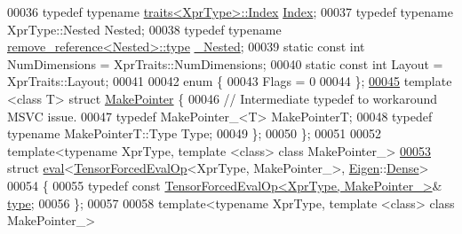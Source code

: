 \begin{DoxyCode}
00036   \textcolor{keyword}{typedef} \textcolor{keyword}{typename} \hyperlink{struct_eigen_1_1internal_1_1traits}{traits<XprType>::Index} \hyperlink{namespace_eigen_a62e77e0933482dafde8fe197d9a2cfde}{Index};
00037   \textcolor{keyword}{typedef} \textcolor{keyword}{typename} XprType::Nested Nested;
00038   \textcolor{keyword}{typedef} \textcolor{keyword}{typename} \hyperlink{group___sparse_core___module}{remove\_reference<Nested>::type} 
      \hyperlink{group___sparse_core___module}{\_Nested};
00039   \textcolor{keyword}{static} \textcolor{keyword}{const} \textcolor{keywordtype}{int} NumDimensions = XprTraits::NumDimensions;
00040   \textcolor{keyword}{static} \textcolor{keyword}{const} \textcolor{keywordtype}{int} Layout = XprTraits::Layout;
00041 
00042   \textcolor{keyword}{enum} \{
00043     Flags = 0
00044   \};
\hyperlink{struct_eigen_1_1internal_1_1traits_3_01_tensor_forced_eval_op_3_01_xpr_type_00_01_make_pointer___01_4_01_4_1_1_make_pointer}{00045}   \textcolor{keyword}{template} <\textcolor{keyword}{class} T> \textcolor{keyword}{struct }\hyperlink{struct_eigen_1_1_make_pointer}{MakePointer} \{
00046     \textcolor{comment}{// Intermediate typedef to workaround MSVC issue.}
00047     \textcolor{keyword}{typedef} MakePointer\_<T> MakePointerT;
00048     \textcolor{keyword}{typedef} \textcolor{keyword}{typename} MakePointerT::Type Type;
00049   \};
00050 \};
00051 
00052 \textcolor{keyword}{template}<\textcolor{keyword}{typename} XprType, \textcolor{keyword}{template} <\textcolor{keyword}{class}> \textcolor{keyword}{class }MakePointer\_>
\hyperlink{struct_eigen_1_1internal_1_1eval_3_01_tensor_forced_eval_op_3_01_xpr_type_00_01_make_pointer___01_4_00_01_eigen_1_1_dense_01_4}{00053} \textcolor{keyword}{struct }\hyperlink{struct_eigen_1_1internal_1_1eval}{eval}<\hyperlink{class_eigen_1_1_tensor_forced_eval_op}{TensorForcedEvalOp}<XprType, MakePointer\_>, 
      \hyperlink{namespace_eigen}{Eigen}::\hyperlink{struct_eigen_1_1_dense}{Dense}>
00054 \{
00055   \textcolor{keyword}{typedef} \textcolor{keyword}{const} \hyperlink{class_eigen_1_1_tensor_forced_eval_op}{TensorForcedEvalOp<XprType, MakePointer\_>}& 
      \hyperlink{class_eigen_1_1_tensor_forced_eval_op}{type};
00056 \};
00057 
00058 \textcolor{keyword}{template}<\textcolor{keyword}{typename} XprType, \textcolor{keyword}{template} <\textcolor{keyword}{class}> \textcolor{keyword}{class }MakePointer\_>

\end{DoxyCode}
